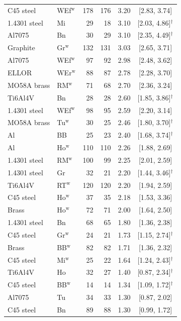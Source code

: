 \documentclass[final,3p,times,twocolumn]{elsarticle}
\theoremstyle{definition}
\begin{document}
\begin{table}[htbp]
\begin{tabular}{@{}llrrrc@{}}
    C45 steel & WEf$^{\text{w}}$ & 178 & 176 & 3.20 & [2.83, 3.74] \\
    1.4301 steel & Mi & 29 & 18 & 3.10 & [2.03, 4.86]$^{\dagger}$ \\
    Al7075 & Bn & 30 & 29 & 3.10 & [2.35, 4.49]$^{\dagger}$ \\
    Graphite & Gr$^{\text{w}}$ & 132 & 131 & 3.03 & [2.65, 3.71] \\
    Al7075 & WEf$^{\text{w}}$ & 97 & 92 & 2.98 & [2.48, 3.62] \\
    ELLOR & WEr$^{\text{w}}$ & 88 & 87 & 2.78 & [2.28, 3.70] \\
    MO58A brass & RM$^{\text{w}}$ & 71 & 68 & 2.70 & [2.36, 3.24] \\
    Ti6Al4V & Bn & 28 & 28 & 2.60 & [1.85, 3.86]$^{\dagger}$ \\
    1.4301 steel & WEf$^{\text{w}}$ & 98 & 95 & 2.59 & [2.20, 3.14] \\
    MO58A brass & Tu$^{\text{w}}$ & 30 & 25 & 2.46 & [1.80, 3.70]$^{\dagger}$ \\
    Al & BB & 25 & 23 & 2.40 & [1.68, 3.74]$^{\dagger}$ \\
    Al & Ho$^{\text{w}}$ & 110 & 110 & 2.26 & [1.88, 2.69] \\
    1.4301 steel & RM$^{\text{w}}$ & 100 & 99 & 2.25 & [2.01, 2.59] \\
    1.4301 steel & Gr & 32 & 21 & 2.20 & [1.44, 3.46]$^{\dagger}$ \\
    Ti6Al4V & RT$^{\text{w}}$ & 120 & 120 & 2.20 & [1.94, 2.59] \\
    C45 steel & Ho$^{\text{w}}$ & 37 & 35 & 2.18 & [1.53, 3.36] \\
    Brass & Ho$^{\text{w}}$ & 72 & 71 & 2.00 & [1.64, 2.50] \\
    1.4301 steel & Bn & 68 & 65 & 1.80 & [1.36, 2.38] \\
    C45 steel & Gr$^{\text{w}}$ & 24 & 21 & 1.73 & [1.15, 2.74]$^{\dagger}$ \\
    Brass & BB$^{\text{w}}$ & 82 & 82 & 1.71 & [1.36, 2.32] \\
    C45 steel & Mi$^{\text{w}}$ & 25 & 22 & 1.64 & [1.24, 2.43]$^{\dagger}$ \\
    Ti6Al4V & Ho & 32 & 27 & 1.40 & [0.87, 2.34]$^{\dagger}$ \\
    C45 steel & BB$^{\text{w}}$ & 14 & 14 & 1.34 & [1.09, 1.72]$^{\dagger}$ \\
    Al7075 & Tu & 34 & 33 & 1.30 & [0.87, 2.02] \\
    C45 steel & Bn & 89 & 88 & 1.30 & [0.99, 1.72] \\

\end{tabular}
\end{table}
\end{document}
